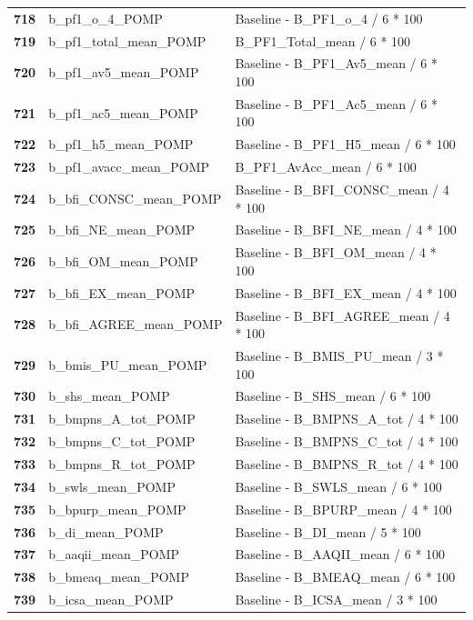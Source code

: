 \documentclass[
  letterpaper,
  DIV=11,
  numbers=noendperiod]{scrartcl}
\begin{document}
\begin{longtable}[t]{>{}cll}
\textbf{718} & b\_pf1\_o\_4\_POMP & Baseline - B\_PF1\_o\_4 / 6 * 100\\
\textbf{719} & b\_pf1\_total\_mean\_POMP & B\_PF1\_Total\_mean / 6 * 100\\
\textbf{720} & b\_pf1\_av5\_mean\_POMP & Baseline - B\_PF1\_Av5\_mean / 6 * 100\\
\addlinespace
\textbf{721} & b\_pf1\_ac5\_mean\_POMP & Baseline - B\_PF1\_Ac5\_mean / 6 * 100\\
\textbf{722} & b\_pf1\_h5\_mean\_POMP & Baseline - B\_PF1\_H5\_mean / 6 * 100\\
\textbf{723} & b\_pf1\_avacc\_mean\_POMP & B\_PF1\_AvAcc\_mean /  6 * 100\\
\textbf{724} & b\_bfi\_CONSC\_mean\_POMP & Baseline - B\_BFI\_CONSC\_mean / 4 * 100\\
\textbf{725} & b\_bfi\_NE\_mean\_POMP & Baseline - B\_BFI\_NE\_mean / 4 * 100\\
\addlinespace
\textbf{726} & b\_bfi\_OM\_mean\_POMP & Baseline - B\_BFI\_OM\_mean / 4 * 100\\
\textbf{727} & b\_bfi\_EX\_mean\_POMP & Baseline - B\_BFI\_EX\_mean / 4 * 100\\
\textbf{728} & b\_bfi\_AGREE\_mean\_POMP & Baseline - B\_BFI\_AGREE\_mean / 4 * 100\\
\textbf{729} & b\_bmis\_PU\_mean\_POMP & Baseline - B\_BMIS\_PU\_mean / 3 * 100\\
\textbf{730} & b\_shs\_mean\_POMP & Baseline - B\_SHS\_mean / 6 * 100\\
\addlinespace
\textbf{731} & b\_bmpns\_A\_tot\_POMP & Baseline - B\_BMPNS\_A\_tot / 4 * 100\\
\textbf{732} & b\_bmpns\_C\_tot\_POMP & Baseline - B\_BMPNS\_C\_tot / 4 * 100\\
\textbf{733} & b\_bmpns\_R\_tot\_POMP & Baseline - B\_BMPNS\_R\_tot / 4 * 100\\
\textbf{734} & b\_swls\_mean\_POMP & Baseline - B\_SWLS\_mean / 6 * 100\\
\textbf{735} & b\_bpurp\_mean\_POMP & Baseline - B\_BPURP\_mean / 4 * 100\\
\addlinespace
\textbf{736} & b\_di\_mean\_POMP & Baseline - B\_DI\_mean / 5 * 100\\
\textbf{737} & b\_aaqii\_mean\_POMP & Baseline - B\_AAQII\_mean / 6 * 100\\
\textbf{738} & b\_bmeaq\_mean\_POMP & Baseline - B\_BMEAQ\_mean / 6 * 100\\
\textbf{739} & b\_icsa\_mean\_POMP & Baseline - B\_ICSA\_mean / 3 * 100\\

\end{longtable}
\end{document}
